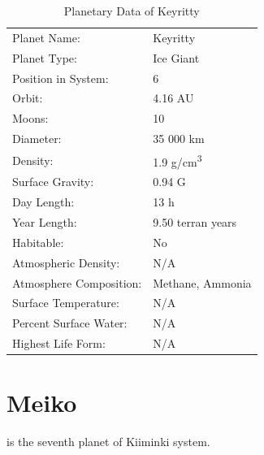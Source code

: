 \documentclass{tufte-book}
\begin{document}
\bigskip
\begin{table}
\begin{minipage}{\textwidth}
\begin{center}
\begin{tabular}{ll}
\toprule
Planet Name: & Keyritty \\
Planet Type: & Ice Giant \\
Position in System: & 6 \\
Orbit: & 4.16 AU \\
Moons: & 10 \\
Diameter: & 35 000 km \\
Density: & 1.9 g/cm\textsuperscript{3} \\
Surface Gravity: & 0.94 G \\
Day Length: & 13 h \\
Year Length: & 9.50 terran years \\
Habitable: & No \\
\quad Atmospheric Density: & N/A \\
\quad Atmosphere Composition: & Methane, Ammonia \\
\quad Surface Temperature: & N/A \\
\quad Percent Surface Water: & N/A \\
\quad Highest Life Form: & N/A \\

\bottomrule
\end{tabular}
\end{center}
\end{minipage}
\caption{Planetary Data of Keyritty}
\end{table}


\section{Meiko}

 is the seventh planet of Kiiminki system.
\end{document}
